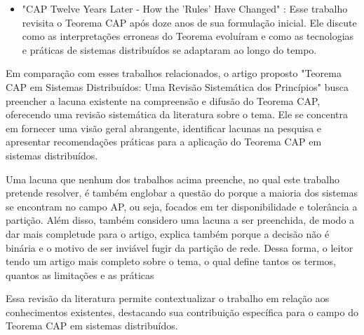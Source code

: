 \begin{itemize}
    \item "CAP Twelve Years Later - How the 'Rules' Have Changed" \cite{TwentyYearsLaterEricBrewer2012}: Esse trabalho revisita o Teorema CAP após doze anos de sua formulação inicial. Ele discute como as interpretações erroneas do Teorema evoluíram e como as tecnologias e práticas de sistemas distribuídos se adaptaram ao longo do tempo. 
    
\end{itemize}
Em comparação com esses trabalhos relacionados, o artigo proposto "Teorema CAP em Sistemas Distribuídos: Uma Revisão Sistemática dos Princípios" busca preencher a lacuna existente na compreensão e difusão do Teorema CAP, oferecendo uma revisão sistemática da literatura sobre o tema. Ele se concentra em fornecer uma visão geral abrangente, identificar lacunas na pesquisa e apresentar recomendações práticas para a aplicação do Teorema CAP em sistemas distribuídos.

Uma lacuna que nenhum dos trabalhos acima preenche, no qual este trabalho pretende resolver, é também englobar a questão do porque a maioria dos sistemas se encontram no campo AP, ou seja, focados em ter disponibilidade e tolerância a partição. Além disso, também considero uma lacuna a ser preenchida, de modo a dar mais completude para o artigo, explica também porque a decisão não é binária e o motivo de ser inviável fugir da partição de rede. Dessa forma, o leitor tendo um artigo mais completo sobre o tema, o qual define tantos os termos, quantos as limitações e as práticas 

Essa revisão da literatura permite contextualizar o trabalho em relação aos conhecimentos existentes, destacando sua contribuição específica para o campo do Teorema CAP em sistemas distribuídos.



